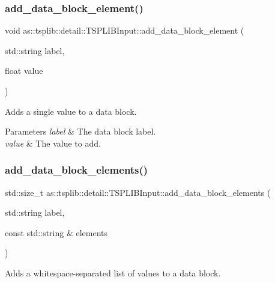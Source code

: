 \subsubsection{\texorpdfstring{add\+\_\+data\+\_\+block\+\_\+element()}{add\_data\_block\_element()}}
{\footnotesize\ttfamily void as\+::tsplib\+::detail\+::\+T\+S\+P\+L\+I\+B\+Input\+::add\+\_\+data\+\_\+block\+\_\+element (\begin{DoxyParamCaption}\item[{std\+::string}]{label,  }\item[{float}]{value }\end{DoxyParamCaption})\hspace{0.3cm}{\ttfamily [inline]}}



Adds a single value to a data block. 


\begin{DoxyParams}{Parameters}
{\em label} & The data block label. \\
\hline
{\em value} & The value to add. \\
\hline
\end{DoxyParams}
\mbox{\label{classas_1_1tsplib_1_1detail_1_1TSPLIBInput_ab046259b21565dce4c28136a72662484}} 
\subsubsection{\texorpdfstring{add\+\_\+data\+\_\+block\+\_\+elements()}{add\_data\_block\_elements()}}
{\footnotesize\ttfamily std\+::size\+\_\+t as\+::tsplib\+::detail\+::\+T\+S\+P\+L\+I\+B\+Input\+::add\+\_\+data\+\_\+block\+\_\+elements (\begin{DoxyParamCaption}\item[{std\+::string}]{label,  }\item[{const std\+::string \&}]{elements }\end{DoxyParamCaption})\hspace{0.3cm}{\ttfamily [inline]}}



Adds a whitespace-\/separated list of values to a data block. 


